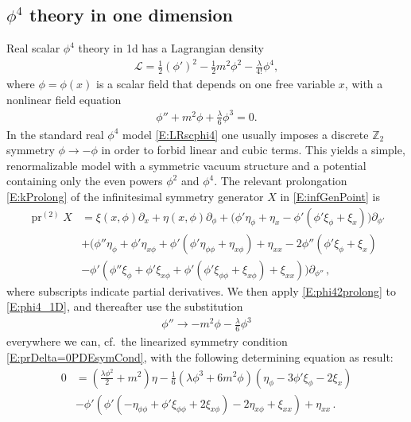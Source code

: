 \documentclass[a4paper,hidelinks, 12pt]{article}
\numberwithin{equation}{section}
\theoremstyle{plain}
\newcommand{\nn}{\nonumber}
\newcommand{\on}{\operatorname}
\begin{document}
\subsection{$\phi^4$ theory in one dimension}
\label{sec:Phi4TheoryIn1dSpacetime}
Real scalar $\phi^4$ theory in 1d has a Lagrangian density
\begin{align}\label{E:LRscphi4}
	\mathcal{L} = \frac{1}{2}  (\phi')^2  - \frac{1}{2} m^2 \phi^2 - \frac{\lambda}{4!} \phi^4,
\end{align}
where $\phi=\phi(x)$ is a scalar field that depends on one free variable $x$, with a nonlinear field equation
\begin{align}\label{E:phi4_1D}
   \phi'' + m^2 \phi +\frac{\lambda}{6} \phi^3=0.
\end{align}
In the standard real $\phi^4$ model \eqref{E:LRscphi4} one usually imposes a discrete
$\mathbb{Z}_2$ symmetry $\phi \to -\phi$ in order to forbid linear and
cubic terms. This yields a simple, renormalizable model with a symmetric
vacuum structure and a potential containing only the even powers
$\phi^2$ and $\phi^4$.
The relevant prolongation \eqref{E:kProlong} of the infinitesimal symmetry generator $X$ in \eqref{E:infGenPoint} is 
\begin{align}\label{E:phi42prolong}
	\on{pr}^{(2)}X&=\xi(x,\phi) {\partial_x}  + \eta(x,\phi){\partial_\phi }   
	+ \big(\phi' \eta _{\phi }+\eta
   _{x}-\phi' \left(\phi' \xi _{\phi }+\xi _{x}\right)\big){\partial_{\phi'}} \nn \\
	&+ \Big(\phi'' \eta _{\phi }+\phi' \eta _{x\phi }+\phi'
   \left(\phi' \eta _{\phi \phi }+\eta _{x\phi }\right)+\eta
   _{xx}-2 \phi'' \left(\phi' \xi _{\phi }+\xi
   _{x}\right) \nn \\
	&-\phi' \left(\phi'' \xi _{\phi
   }+\phi' \xi _{x\phi }+\phi' \left(\phi' \xi _{\phi \phi
   }+\xi _{x\phi }\right)+\xi _{xx}\right)\Big){\partial_{\phi''}}\, ,
\end{align}
where subscripts indicate partial derivatives.
We then apply \eqref{E:phi42prolong} to \eqref{E:phi4_1D},
and thereafter use the substitution 
\begin{align}\label{E:substPhi4}
	\phi''\to - m^2 \phi -\frac{\lambda}{6} \phi^3
\end{align}
everywhere we can, cf.~the linearized
symmetry condition \eqref{E:prDelta=0PDEsymCond}, with the following determining equation as result:
\begin{align}\label{E:detEqsPhi4}
0&=\left(\tfrac{\lambda  \phi ^2}{2}+m^2\right) \eta -\tfrac{1}{6}
   \left(\lambda  \phi ^3+6 m^2 \phi \right) \left(\eta _{\phi }-3
   \phi ' \xi _{\phi }-2 \xi _{x}\right)\nn \\&-\phi ' \left(\phi '
   \left(-\eta _{\phi \phi }+\phi ' \xi _{\phi \phi }+2 \xi
   _{x\phi }\right)-2 \eta _{x\phi }+\xi _{xx}\right)+\eta
   _{xx} \, .
	\end{align}
\end{document}
